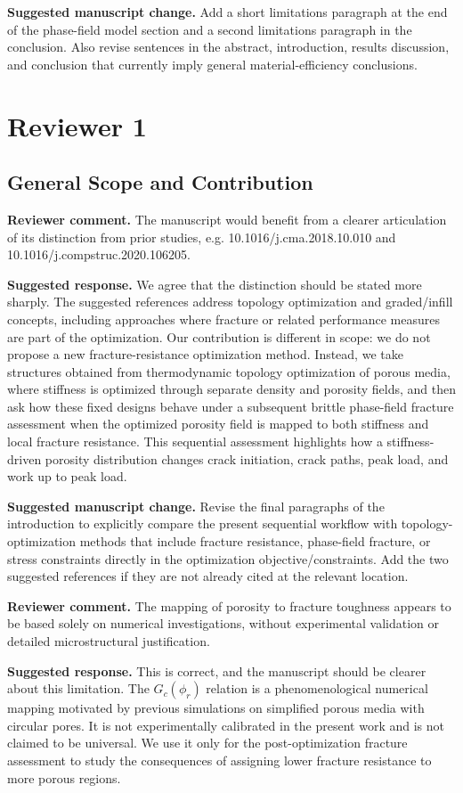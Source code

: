 \documentclass[11pt,a4paper]{article}
\newcommand{\comment}[1]{\par\noindent\textbf{Reviewer comment.} #1\par}
\newcommand{\response}[1]{\par\noindent\textbf{Suggested response.} #1\par}
\newcommand{\change}[1]{\par\noindent\textbf{Suggested manuscript change.} #1\par}
\begin{document}
\change{Add a short limitations paragraph at the end of the phase-field model
section and a second limitations paragraph in the conclusion. Also revise
sentences in the abstract, introduction, results discussion, and conclusion that
currently imply general material-efficiency conclusions.}

\section*{Reviewer 1}

\subsection*{General Scope and Contribution}

\comment{The manuscript would benefit from a clearer articulation of its
distinction from prior studies, e.g. 10.1016/j.cma.2018.10.010 and
10.1016/j.compstruc.2020.106205.}

\response{We agree that the distinction should be stated more sharply. The
suggested references address topology optimization and graded/infill concepts,
including approaches where fracture or related performance measures are part of
the optimization. Our contribution is different in scope: we do not propose a
new fracture-resistance optimization method. Instead, we take structures
obtained from thermodynamic topology optimization of porous media, where
stiffness is optimized through separate density and porosity fields, and then
ask how these fixed designs behave under a subsequent brittle phase-field
fracture assessment when the optimized porosity field is mapped to both
stiffness and local fracture resistance. This sequential assessment highlights
how a stiffness-driven porosity distribution changes crack initiation, crack
paths, peak load, and work up to peak load.}

\change{Revise the final paragraphs of the introduction to explicitly compare
the present sequential workflow with topology-optimization methods that include
fracture resistance, phase-field fracture, or stress constraints directly in the
optimization objective/constraints. Add the two suggested references if they are
not already cited at the relevant location.}

\comment{The mapping of porosity to fracture toughness appears to be based
solely on numerical investigations, without experimental validation or detailed
microstructural justification.}

\response{This is correct, and the manuscript should be clearer about this
limitation. The \(G_c(\phi_r)\) relation is a phenomenological numerical
mapping motivated by previous simulations on simplified porous media with
circular pores. It is not experimentally calibrated in the present work and is
not claimed to be universal. We use it only for the post-optimization fracture
assessment to study the consequences of assigning lower fracture resistance to
more porous regions.}
\end{document}

